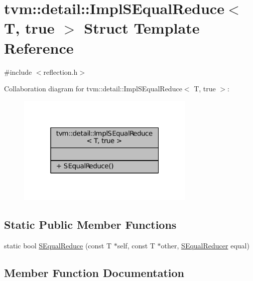 \hypertarget{structtvm_1_1detail_1_1ImplSEqualReduce_3_01T_00_01true_01_4}{}\section{tvm\+:\+:detail\+:\+:Impl\+S\+Equal\+Reduce$<$ T, true $>$ Struct Template Reference}
\label{structtvm_1_1detail_1_1ImplSEqualReduce_3_01T_00_01true_01_4}


{\ttfamily \#include $<$reflection.\+h$>$}



Collaboration diagram for tvm\+:\+:detail\+:\+:Impl\+S\+Equal\+Reduce$<$ T, true $>$\+:
\nopagebreak
\begin{figure}[H]
\begin{center}
\leavevmode
\includegraphics[width=241pt]{structtvm_1_1detail_1_1ImplSEqualReduce_3_01T_00_01true_01_4__coll__graph}
\end{center}
\end{figure}
\subsection*{Static Public Member Functions}
\begin{DoxyCompactItemize}
\item 
static bool \hyperlink{structtvm_1_1detail_1_1ImplSEqualReduce_3_01T_00_01true_01_4_a66b671c7505fb3c4d9ff215ac67d3c84}{S\+Equal\+Reduce} (const T $\ast$self, const T $\ast$other, \hyperlink{classtvm_1_1SEqualReducer}{S\+Equal\+Reducer} equal)
\end{DoxyCompactItemize}


\subsection{Member Function Documentation}
